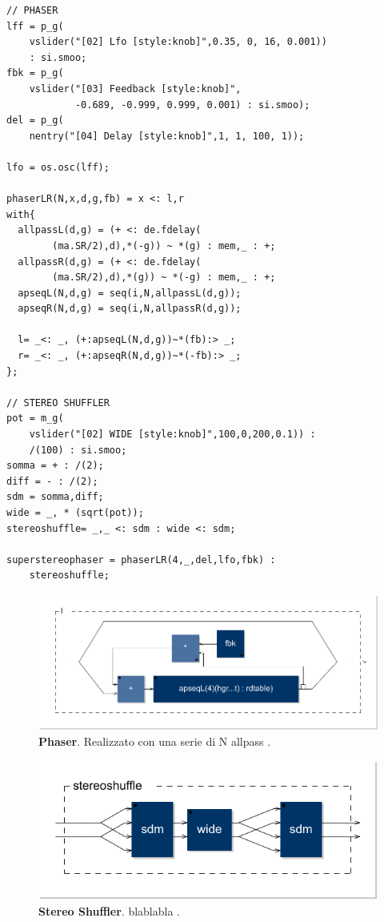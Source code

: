 \documentclass[
	a4paper,
	twocolumn
	]{article}
\begin{document}
\begin{lstlisting}
// PHASER
lff = p_g(
	vslider("[02] Lfo [style:knob]",0.35, 0, 16, 0.001))
	: si.smoo;
fbk = p_g(
	vslider("[03] Feedback [style:knob]",
	        -0.689, -0.999, 0.999, 0.001) : si.smoo);
del = p_g(
	nentry("[04] Delay [style:knob]",1, 1, 100, 1));

lfo = os.osc(lff);

phaserLR(N,x,d,g,fb) = x <: l,r
with{
  allpassL(d,g) = (+ <: de.fdelay(
		(ma.SR/2),d),*(-g)) ~ *(g) : mem,_ : +;
  allpassR(d,g) = (+ <: de.fdelay(
		(ma.SR/2),d),*(g)) ~ *(-g) : mem,_ : +;
  apseqL(N,d,g) = seq(i,N,allpassL(d,g));
  apseqR(N,d,g) = seq(i,N,allpassR(d,g));

  l= _<: _, (+:apseqL(N,d,g))~*(fb):> _;
  r= _<: _, (+:apseqR(N,d,g))~*(-fb):> _;
};

// STEREO SHUFFLER
pot = m_g(
	vslider("[02] WIDE [style:knob]",100,0,200,0.1)) :
	/(100) : si.smoo;
somma = + : /(2);
diff = - : /(2);
sdm = somma,diff;
wide = _, * (sqrt(pot));
stereoshuffle= _,_ <: sdm : wide <: sdm;

superstereophaser = phaserLR(4,_,del,lfo,fbk) :
	stereoshuffle;
\end{lstlisting}

\begin{figure}[h]
\begin{center}
\includegraphics[width=.47\textwidth]{img/phaser}
\caption{\textbf{Phaser}. Realizzato con una serie di N allpass \cite{cr96cmt} .}
\label{phaser}
\end{center}
\end{figure}

\begin{figure}[h]
\begin{center}
\includegraphics[width=.47\textwidth]{img/mid-side-shuffler}
\caption{\textbf{Stereo Shuffler}. blablabla \cite{ab58}.}
\label{stereoshuffler}
\end{center}
\end{figure}
\end{document}
